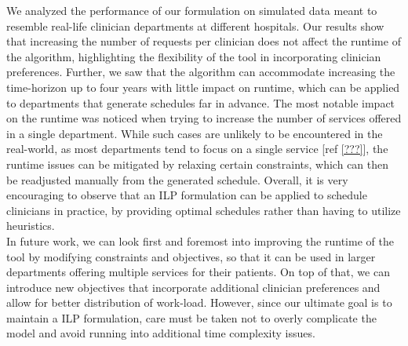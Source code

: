 We analyzed the performance of our formulation on simulated data meant to resemble real-life clinician departments at different hospitals. Our results show that increasing the number of requests per clinician does not affect the runtime of the algorithm, highlighting the flexibility of the tool in incorporating clinician preferences. Further, we saw that the algorithm can accommodate increasing the time-horizon up to four years with little impact on runtime, which can be applied to departments that generate schedules far in advance. The most notable impact on the runtime was noticed when trying to increase the number of services offered in a single department. While such cases are unlikely to be encountered in the real-world, as most departments tend to focus on a single service [ref \ref{???}], the runtime issues can be mitigated by relaxing certain constraints, which can then be readjusted manually from the generated schedule. Overall, it is very encouraging to observe that an ILP formulation can be applied to schedule clinicians in practice, by providing optimal schedules rather than having to utilize heuristics. \\

In future work, we can look first and foremost into improving the runtime of the tool by modifying constraints and objectives, so that it can be used in larger departments offering multiple services for their patients. On top of that, we can introduce new objectives that incorporate additional clinician preferences and allow for better distribution of work-load. However, since our ultimate goal is to maintain a ILP formulation, care must be taken not to overly complicate the model and avoid running into additional time complexity issues.